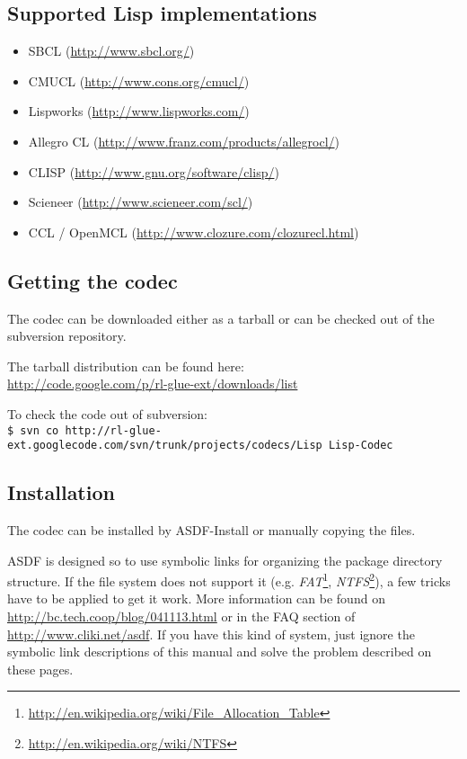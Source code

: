 \documentclass[11pt,a4paper,dvipdfm]{article}
\newcommand{\selfref}[1]{\href{#1}{#1}}
\newcommand{\footref}[2]{\textsl{#1}\footnote{\selfref{#2}}}
\newcommand{\prompttext}[1]{\texttt{#1}}
\newcommand{\shprompt}[1]{\prompttext{\$ #1}}
\begin{document}
\subsection{Supported Lisp implementations}

\begin{itemize}
\item[] SBCL (\selfref{http://www.sbcl.org/})
\item[] CMUCL (\selfref{http://www.cons.org/cmucl/})
\item[] Lispworks (\selfref{http://www.lispworks.com/})
\item[] Allegro CL (\selfref{http://www.franz.com/products/allegrocl/})
\item[] CLISP (\selfref{http://www.gnu.org/software/clisp/})
\item[] Scieneer (\selfref{http://www.scieneer.com/scl/})
\item[] CCL / OpenMCL (\selfref{http://www.clozure.com/clozurecl.html})
\end{itemize}

\subsection{Getting the codec}

The codec can be downloaded either as a tarball or can be checked out of the
subversion repository.

The tarball distribution can be found here: \\
\selfref{http://code.google.com/p/rl-glue-ext/downloads/list}

To check the code out of subversion: \\
\shprompt{svn co
          http://rl-glue-ext.googlecode.com/svn/trunk/projects/codecs/Lisp
          Lisp-Codec}

\subsection{Installation}

The codec can be installed by ASDF-Install or manually copying the files.

ASDF is designed so to use symbolic links for organizing the package directory
structure. If the file system does not support it (e.g.
\footref{FAT}{http://en.wikipedia.org/wiki/File\_Allocation\_Table},
\footref{NTFS}{http://en.wikipedia.org/wiki/NTFS}), a few
tricks have to be applied to get it work. More information can be
found on \selfref{http://bc.tech.coop/blog/041113.html} or in the FAQ section
of \selfref{http://www.cliki.net/asdf}. If you have this kind of system, just
ignore the symbolic link descriptions of this manual and solve the problem
described on these pages.
\end{document}
